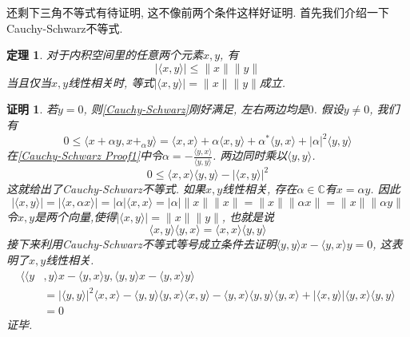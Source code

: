 \documentclass[a4paper,11pt]{article}
\theoremstyle{mystyle}
\newtheorem{theorem}{\hspace{2em}定理}[section]
\newtheorem{Proof}{\hspace{2em}证明}[section]
\begin{document}
还剩下三角不等式有待证明, 这不像前两个条件这样好证明. 首先我们介绍一下Cauchy-Schwarz不等式.
\begin{theorem}
  对于内积空间里的任意两个元素$x,y$, 有
  \begin{equation}\label{Cauchy-Schwarz}
    |\langle x,y\rangle|\leq\|x\|\|y\|
  \end{equation}
  当且仅当$x,y$线性相关时, 等式$|\langle x,y\rangle|=\|x\|\|y\|$成立.
\end{theorem}
\begin{Proof}
  若$y=0$, 则\eqref{Cauchy-Schwarz}刚好满足, 左右两边均是$0$. 假设$y\neq 0$, 我们有
  \begin{equation*}\label{Cauchy-Schwarz Proof1}
    0\leq\langle x+\alpha y,x+_\alpha y\rangle=\langle x,x\rangle+\alpha\langle x,y\rangle+\alpha^*\langle y,x\rangle+|\alpha|^2\langle y,y\rangle
  \end{equation*}
  在\eqref{Cauchy-Schwarz Proof1}中令$\alpha=-\frac{\langle y,x\rangle}{\langle y,y\rangle}$. 两边同时乘以$\langle y,y\rangle$.
  \begin{equation*}
    0\leq\langle x,x\rangle\langle y,y\rangle-|\langle x,y\rangle|^2
  \end{equation*}
  这就给出了Cauchy-Schwarz不等式. 如果$x,y$线性相关, 存在$\alpha\in \mathbb{C}$有$x=\alpha y$. 因此
  \begin{equation*}
    |\langle x,y\rangle|=|\langle x,\alpha x\rangle|=|\alpha|\langle x,x\rangle=|\alpha|\|x\|\|x\|=\|x\|\|\alpha x\|=\|x\|\|\alpha y\|
  \end{equation*}
  令$x,y$是两个向量,使得$|\langle x,y\rangle|=\|x\|\|y\|$, 也就是说
  \begin{equation*}
    \langle x,y\rangle\langle y,x\rangle=\langle x,x\rangle\langle y,y\rangle
  \end{equation*}
  接下来利用Cauchy-Schwarz不等式等号成立条件去证明$\langle y,y\rangle x-\langle y,x\rangle y=0$, 这表明了$x,y$线性相关.
  \begin{equation*}
  \begin{split}
     \langle\langle y&,y\rangle x-\langle y,x\rangle y,\langle y,y\rangle x-\langle y,x\rangle y\rangle \\
       & =|\langle y,y\rangle|^2\langle x,x\rangle-\langle y,y\rangle\langle y,x\rangle\langle x,y\rangle-\langle y,x\rangle\langle y,y\rangle\langle y,x\rangle+|\langle x,y\rangle|\langle y,x\rangle\langle y,y\rangle \\
       & =0
  \end{split}
  \end{equation*}
  证毕.
\end{Proof}
\end{document}

